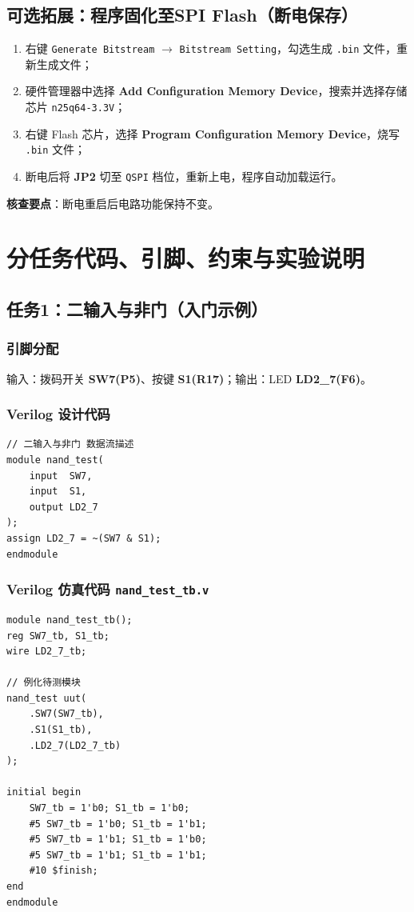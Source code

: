 \documentclass[11pt,a4paper]{article}
\begin{document}
\subsection{可选拓展：程序固化至SPI Flash（断电保存）}
\begin{enumerate}
    \item 右键 \texttt{Generate Bitstream} $\rightarrow$ \texttt{Bitstream Setting}，勾选生成 \texttt{.bin} 文件，重新生成文件；
    \item 硬件管理器中选择 \textbf{Add Configuration Memory Device}，搜索并选择存储芯片 \texttt{n25q64-3.3V}；
    \item 右键 Flash 芯片，选择 \textbf{Program Configuration Memory Device}，烧写 \texttt{.bin} 文件；
    \item 断电后将 \textbf{JP2} 切至 \texttt{QSPI} 档位，重新上电，程序自动加载运行。
\end{enumerate}
\textbf{核查要点}：断电重启后电路功能保持不变。

\newpage
\section{分任务代码、引脚、约束与实验说明}
\subsection{任务1：二输入与非门（入门示例）}
\subsubsection{引脚分配}
输入：拨码开关 \textbf{SW7(P5)}、按键 \textbf{S1(R17)}；输出：LED \textbf{LD2\_7(F6)}。

\subsubsection{Verilog 设计代码}
\begin{lstlisting}
// 二输入与非门 数据流描述
module nand_test(
    input  SW7,
    input  S1,
    output LD2_7
);
assign LD2_7 = ~(SW7 & S1);
endmodule
\end{lstlisting}

\subsubsection{Verilog 仿真代码 \texttt{nand\_test\_tb.v}}
\begin{lstlisting}
module nand_test_tb();
reg SW7_tb, S1_tb;
wire LD2_7_tb;

// 例化待测模块
nand_test uut(
    .SW7(SW7_tb),
    .S1(S1_tb),
    .LD2_7(LD2_7_tb)
);

initial begin
    SW7_tb = 1'b0; S1_tb = 1'b0;
    #5 SW7_tb = 1'b0; S1_tb = 1'b1;
    #5 SW7_tb = 1'b1; S1_tb = 1'b0;
    #5 SW7_tb = 1'b1; S1_tb = 1'b1;
    #10 $finish;
end
endmodule
\end{lstlisting}
\end{document}
